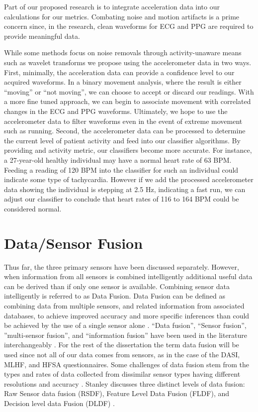 Part of our proposed research is to integrate acceleration data into our calculations for our metrics. Combating noise  and motion artifacts is a prime concern since, in the research, clean waveforms for ECG and PPG are required to provide meaningful data.

While some methods focus on noise removals through activity-unaware means such as wavelet transforms \cite{Liu2011} we propose using the accelerometer data in two ways. First, minimally, the acceleration data can provide a confidence level to our acquired waveforms. In a binary movement analysis, where the result is either “moving” or “not moving”, we can choose to accept or discard our readings. With a more fine tuned approach, we can begin to associate movement with correlated changes in the ECG and PPG waveforms. Ultimately, we hope to use the accelerometer data to filter waveforms even in the event of extreme movement such as running. Second, the accelerometer data can be processed to determine the current level of patient activity and feed into our classifier algorithms. By providing and activity metric, our classifiers become more accurate. For instance, a 27-year-old healthy individual may have a normal heart rate of 63 BPM. Feeding a reading of 120 BPM into the classifier for such an individual could indicate some type of tachycardia. However if we add the processed accelerometer data showing the individual is stepping at 2.5 Hz, indicating a fast run, we can adjust our classifier to conclude that heart rates of 116 to 164 BPM could be considered normal.

\section{Data/Sensor Fusion}
\label{sec:DataFusion}
Thus far, the three primary sensors have been discussed separately. However, when information from all sensors is combined intelligently additional useful data can be derived than if only one sensor is available.  Combining sensor data intelligently is referred to as Data Fusion. Data Fusion can be defined as combining data from multiple sensors, and related information from associated databases, to achieve improved accuracy and more specific inferences than could be achieved by the use of a single sensor alone \cite{Hall1997}.  “Data fusion”, “Sensor fusion”,  ”multi-sensor fusion”, and “information fusion” have been used in the literature interchangeably \cite{Crowley1993} \cite{Ceruti2006} \cite{Dantu2006} \cite{Dong2006} \cite{Durrant-Whyte2005} \cite{Qi2001} \cite{Stanley2007} \cite{Wu2002}. For the rest of the dissertation the term data fusion will be used since not all of our data comes from sensors, as in the case of the DASI, MLHF, and HFSA questionnaires.  Some challenges of data fusion stem from the types and rates of data collected from dissimilar sensor types having different resolutions and accuracy \cite{Wu2002}.  Stanley discusses three distinct levels of data fusion: Raw Sensor data fusion (RSDF), Feature Level Data Fusion (FLDF), and Decision level data Fusion (DLDF) \cite{Stanley2007}.  

